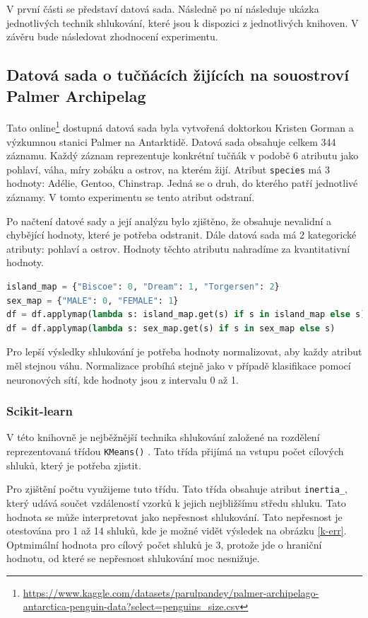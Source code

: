 V první části se představí datová sada. Následně po ní následuje ukázka jednotlivých technik shlukování, které jsou k dispozici z jednotlivých knihoven.
V závěru bude následovat zhodnocení experimentu.

\subsection*{Datová sada o tučňácích žijících na souostroví Palmer Archipelag}
Tato online\footnote{\url{https://www.kaggle.com/datasets/parulpandey/palmer-archipelago-antarctica-penguin-data?select=penguins_size.csv}} dostupná datová sada byla vytvořená doktorkou Kristen Gorman a výzkumnou stanici Palmer na Antarktidě. Datová sada obsahuje celkem 344 záznamu. Každý záznam reprezentuje konkrétní tučňák v podobě 6 atributu jako pohlaví, váha, míry zobáku a ostrov, na kterém žijí. Atribut \verb|species| má 3 hodnoty: Adélie, Gentoo, Chinstrap. Jedná se o druh, do kterého patří jednotlivé záznamy. V tomto experimentu se tento atribut odstraní.

Po načtení datové sady a její analýzu bylo zjištěno, že obsahuje nevalidní a chybějící hodnoty, které je potřeba odstranit. Dále datová sada má 2 kategorické atributy: pohlaví a ostrov. Hodnoty těchto atributu nahradíme za kvantitativní hodnoty.

\begin{mdframed}
\begin{lstlisting}[language=Python]
island_map = {"Biscoe": 0, "Dream": 1, "Torgersen": 2}
sex_map = {"MALE": 0, "FEMALE": 1}
df = df.applymap(lambda s: island_map.get(s) if s in island_map else s)
df = df.applymap(lambda s: sex_map.get(s) if s in sex_map else s)
\end{lstlisting}   
\end{mdframed}

Pro lepší výsledky shlukování je potřeba hodnoty normalizovat, aby každy atribut měl stejnou váhu. Normalizace probíhá stejně jako v případě klasifikace pomocí neuronových sítí, kde hodnoty jsou z intervalu 0 až 1.

\subsubsection*{Scikit-learn}
V této knihovně je nejběžnější technika shlukování založené na rozdělení reprezentovaná třídou \verb|KMeans()| . Tato třída přijímá na vstupu počet cílových shluků, který je potřeba zjistit. 

Pro zjištění počtu využijeme tuto třídu. Tato třída obsahuje atribut \verb|inertia_|, který udává součet vzdáleností vzorků k jejich nejbližšímu středu shluku. Tato hodnota se může interpretovat jako nepřesnost shlukování. Tato nepřesnost je otestována pro 1 až 14 shluků, kde je možné vidět výsledek na obrázku \ref{k-err}. Optmimální hodnota pro cílový počet shluků je 3, protože jde o hraniční hodnotu, od které se nepřesnost shlukování moc nesnižuje.

